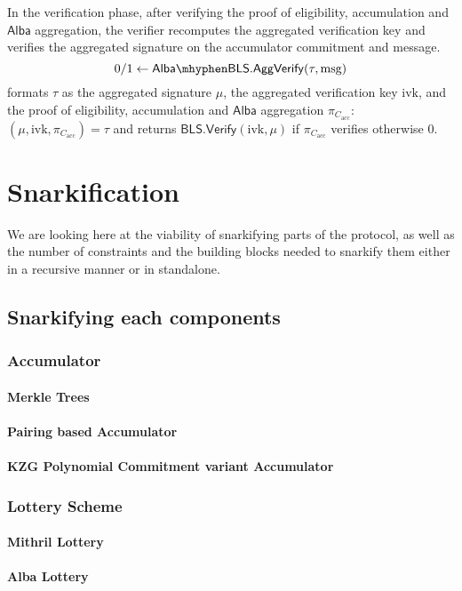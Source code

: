 \documentclass{article}
\newcommand{\m}{\ensuremath{\textrm{msg}}\xspace}
\newcommand{\acc}{\ensuremath{\textrm{acc}}\xspace}
\newcommand{\ivk}{\ensuremath{\textrm{ivk}}\xspace}
\newcommand{\BLS}{\ensuremath{\mathsf{BLS}}\xspace}
\newcommand{\Alba}{\ensuremath{\mathsf{Alba}}\xspace}
\newcommand{\AlbaBls}{\ensuremath{\mathsf{Alba}\mhyphen\mathsf{BLS}\xspace}}
\newcommand{\Verify}{\ensuremath{\mathsf{Verify}}\xspace}
\newcommand{\AggVerify}{\ensuremath{\mathsf{AggVerify}}\xspace}
\begin{document}
In the verification phase, after verifying the proof of eligibility, accumulation and \Alba aggregation, the verifier recomputes the aggregated verification key and verifies the aggregated signature on the accumulator commitment and message.
$$
0/1 \leftarrow \AlbaBls.\AggVerify(\tau, \m)
$$
formats $\tau$ as the aggregated signature $\mu$, the aggregated verification key $\ivk$, and the proof of eligibility, accumulation and \Alba aggregation $\pi_{C_\acc}$: $(\mu, \ivk, \pi_{C_\acc}) = \tau$ and returns $\BLS.\Verify(\ivk, \mu)$ if $\pi_{C_\acc}$ verifies otherwise 0.\\


%
%
%
\section{Snarkification}
We are looking here at the viability of snarkifying parts of the protocol, as well as the number of constraints and the building blocks needed to snarkify them either in a recursive manner or in standalone.

%
%
\subsection{Snarkifying each components}

%
\subsubsection{Accumulator}
\paragraph{Merkle Trees}
\paragraph{Pairing based Accumulator}
\paragraph{KZG Polynomial Commitment variant Accumulator}

%
\subsubsection{Lottery Scheme}
\paragraph{Mithril Lottery}
\paragraph{Alba Lottery}
\end{document}
